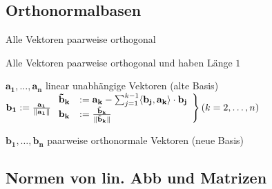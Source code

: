 \documentclass[a4paper,twocolumn]{article}
\begin{document}
	\subsection{Orthonormalbasen}
		
		\begin{fdef}
			Alle Vektoren paarweise orthogonal
		\end{fdef}

		\begin{fdef}
			Alle Vektoren paarweise orthogonal und haben Länge $1$
		\end{fdef}
		
		\begin{falgo}
			$\mathbf{a_1, \ldots, a_n}$ linear unabhängige Vektoren (alte Basis)\\
			
			$
			\mathbf{b_{1}} := \frac{\mathbf{a_{1}}}{\|\mathbf{a_{1}}\|} \\
			\left. 	\begin{array}{rl}

				\mathbf{\tilde{b}_{k}} &:= \mathbf{a_{k}} - \sum_{j = 1}^{k -1} \langle \mathbf{b_{j}}, \mathbf{a_{k}} \rangle \cdot \mathbf{b_{j}} \\
				\mathbf{b_{k}} &:= \frac{\mathbf{\tilde{b}_{k}}}{\|\mathbf{\tilde{b}_{k}}\|}
					\end{array}
			\right\} (k = 2, \ldots, n)
			$
			
			$\mathbf{b_1, \ldots, b_n}$ paarweise orthonormale Vektoren (neue Basis)
		\end{falgo}
	\subsection{Normen von lin. Abb und Matrizen}
		
\end{document}
